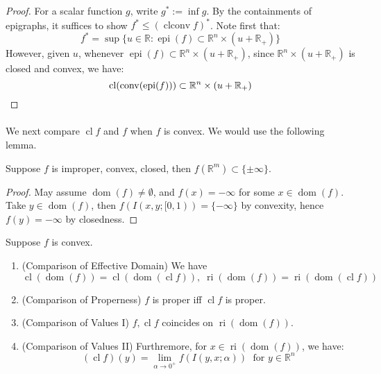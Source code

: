 \begin{proof}
	For a scalar function $g$, write $g^\ast:=\inf g$. By the containments of epigraphs, it suffices to show $f^\ast\leq(\operatorname{clconv}f)^\ast$. Note first that:
	\[
		f^\ast = \sup \{u\in \mathbb{R}: \operatorname{epi}(f)\subset \mathbb{R}^n\times (u + \mathbb{R}_+)\}
	\]
	However, given $u$, whenever $\operatorname{epi}(f)\subset \mathbb{R}^n\times (u + \mathbb{R}_+)$, since $\mathbb{R}^n\times (u + \mathbb{R}_+)$ is closed and convex, we have:
	\[
		\operatorname{cl}(\operatorname{conv}(\operatorname{epi}(f)))\subset \mathbb{R}^n\times (u + \mathbb{R}_+)\qedhere{}
	\]
\end{proof}

\paragraph{}We next compare $\operatorname{cl}f$ and $f$ when $f$ is convex. We would use the following lemma.

\begin{lemm}
	\label{lemm:023-improper-closed-convex}
	Suppose $f$ is improper, convex, closed, then $f(\mathbb{R}^m)\subset\{\pm\infty\}$.
\end{lemm}

\begin{proof}
	May assume $\operatorname{dom}(f)\neq \emptyset$, and $f(x)=-\infty$ for some $x\in \operatorname{dom}(f)$. Take $y\in \operatorname{dom}(f)$, then $f(I(x,y;[0, 1))=\{-\infty\}$ by convexity, hence $f(y)=-\infty$ by closedness.
\end{proof}


\begin{prop}
	\label{prop:023-compare-func-closure}
	Suppose $f$ is convex.
	\begin{enumerate}[label=(\alph*)]
		\item (Comparison of Effective Domain) We have
		      \[
			      \operatorname{cl}(\operatorname{dom}(f))=
			      \operatorname{cl}(\operatorname{dom}(\operatorname{cl}f)),\;
			      \operatorname{ri}(\operatorname{dom}(f))=
			      \operatorname{ri}(\operatorname{dom}(\operatorname{cl}f))
		      \]
		\item (Comparison of Properness) $f$ is proper iff $\operatorname{cl}f$ is proper.
		\item (Comparison of Values I) $f,\operatorname{cl}f$ coincides on $\operatorname{ri}(\operatorname{dom}(f))$.
		\item (Comparison of Values II) Furthremore, for $x\in \operatorname{ri}(\operatorname{dom}(f))$, we have:
		      \[
			      (\operatorname{cl}f)(y)=\lim_{\alpha \to0^+}f(I(y,x;\alpha ))\;\text{ for }y\in \mathbb{R}^n
		      \]
	\end{enumerate}
\end{prop}

